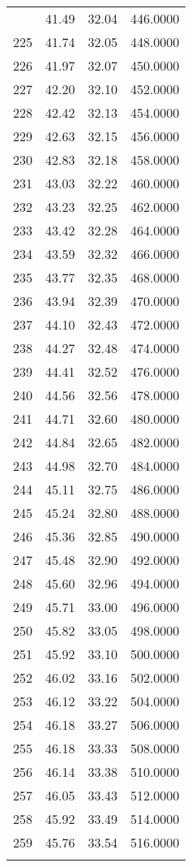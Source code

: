 \documentclass[
  captions=tableheading,
]{scrartcl}
\begin{document}
\begin{longtable} {l|l|l|l}
{224 &	41.49 &	32.04 &	446.0000\\
225 &	41.74 &	32.05 &	448.0000\\
226 &	41.97 &	32.07 &	450.0000\\
227 &	42.20 &	32.10 &	452.0000\\
228 &	42.42 &	32.13 &	454.0000\\
229 &	42.63 &	32.15 &	456.0000\\
230 &	42.83 &	32.18 &	458.0000\\
231 &	43.03 &	32.22 &	460.0000\\
232 &	43.23 &	32.25 &	462.0000\\
233 &	43.42 &	32.28 &	464.0000\\
234 &	43.59 &	32.32 &	466.0000\\
235 &	43.77 &	32.35 &	468.0000\\
236 &	43.94 &	32.39 &	470.0000\\
237 &	44.10 &	32.43 &	472.0000\\
238 &	44.27 &	32.48 &	474.0000\\
239 &	44.41 &	32.52 &	476.0000\\
240 &	44.56 &	32.56 &	478.0000\\
241 &	44.71 &	32.60 &	480.0000\\
242 &	44.84 &	32.65 &	482.0000\\
243 &	44.98 &	32.70 &	484.0000\\
244 &	45.11 &	32.75 &	486.0000\\
245 &	45.24 &	32.80 &	488.0000\\
246 &	45.36 &	32.85 &	490.0000\\
247 &	45.48 &	32.90 &	492.0000\\
248 &	45.60 &	32.96 &	494.0000\\
249 &	45.71 &	33.00 &	496.0000\\
250 &	45.82 &	33.05 &	498.0000\\
251 &	45.92 &	33.10 &	500.0000\\
252 &	46.02 &	33.16 &	502.0000\\
253 &	46.12 &	33.22 &	504.0000\\
254 &	46.18 &	33.27 &	506.0000\\
255 &	46.18 &	33.33 &	508.0000\\
256 &	46.14 &	33.38 &	510.0000\\
257 &	46.05 &	33.43 &	512.0000\\
258 &	45.92 &	33.49 &	514.0000\\
259 &	45.76 &	33.54 &	516.0000\\
}
\end{longtable}
\end{document}
